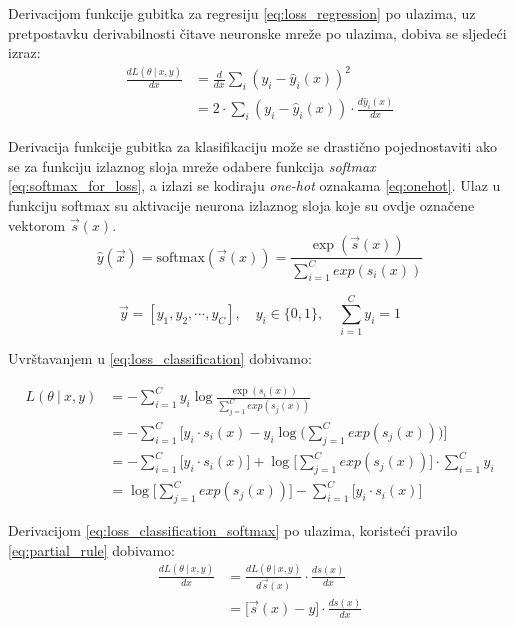 \documentclass[times, utf8, numeric, diplomski]{fer}
\def\dfrac#1#2{\frac{d #1}{d #2}}
\def\probsep{\ |\ }
\begin{document}
Derivacijom funkcije gubitka za regresiju \eqref{eq:loss_regression} po ulazima, uz pretpostavku derivabilnosti čitave neuronske mreže po ulazima, dobiva se sljedeći izraz:
\begin{align}
\dfrac{L(\theta \probsep x,y)}{x} &= \dfrac{}{x}\sum_i(y_i - \hat{y}_i(x))^2 \nonumber \\
&= 2 \cdot \sum_i (y_i - \hat{y}_i(x)) \cdot \dfrac{\hat{y}_i(x)}{x}
\end{align}

Derivacija funkcije gubitka za klasifikaciju može se drastično pojednostaviti ako se za funkciju izlaznog sloja mreže odabere funkcija \textit{softmax} \eqref{eq:softmax_for_loss}, a izlazi se kodiraju \textit{one-hot} oznakama \eqref{eq:onehot}. Ulaz u funkciju softmax su aktivacije neurona izlaznog sloja koje su ovdje označene vektorom $\vec{s}(x)$.
\begin{equation}
\label{eq:softmax_for_loss}
\hat{y}(\vec{x}) = \text{softmax}(\vec{s}(x)) = \frac{\exp(\vec{s}(x))}{\sum_{i=1}^{C} exp(s_i(x))}
\end{equation}

\begin{equation}
\label{eq:onehot}
\vec{y}=[y_1, y_2, \cdots, y_C], \quad y_i \in \{0,1\}, \quad \sum_{i=1}^C y_i = 1
\end{equation}

Uvrštavanjem u \eqref{eq:loss_classification} dobivamo:

\begin{align}
\label{eq:loss_classification_softmax}
L(\theta \probsep x,y) &= - \sum_{i=1}^C y_i \log \frac{\exp(s_i(x))}{\sum_{j=1}^{C} exp(s_j(x))} \nonumber \\
&= - \sum_{i=1}^C \bigg[ y_i \cdot s_i(x) - y_i \log\big(\sum_{j=1}^{C} exp(s_j(x))\big) \bigg] \nonumber \\
&= - \sum_{i=1}^C \big[ y_i \cdot s_i(x) \big] + \log\big[\sum_{j=1}^{C} exp(s_j(x))\big] \cdot \sum_{i=1}^C y_i \nonumber \\
&= \log\big[\sum_{j=1}^{C} exp(s_j(x))\big] - \sum_{i=1}^C \big[ y_i \cdot s_i(x) \big]
\end{align}

Derivacijom \eqref{eq:loss_classification_softmax} po ulazima, koristeći pravilo \eqref{eq:partial_rule} dobivamo:
\begin{align}
\label{eq:loss_classification_softmax_deriv}
\dfrac{L(\theta \probsep x,y)}{x} &= \dfrac{L(\theta \probsep x,y)}{\vec{s}(x)} \cdot \dfrac{s(x)}{x} \nonumber \\
&= \bigg[ \vec{s}(x) - y \bigg] \cdot \dfrac{s(x)}{x}
\end{align}
\end{document}
